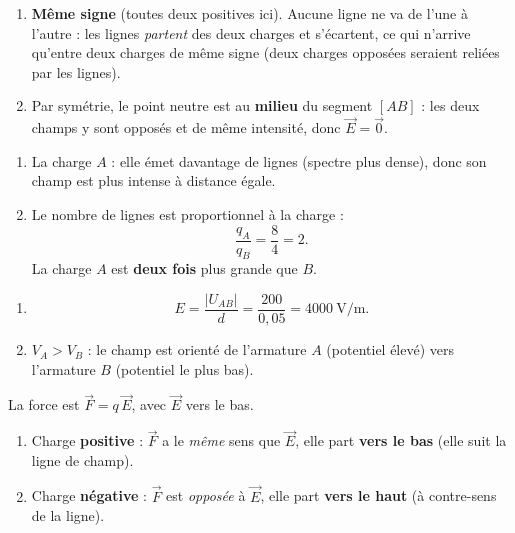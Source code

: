 \documentclass[11pt,a4paper]{article}
\newcommand{\vv}[1]{\vec{#1}}\newcommand{\ds}{\displaystyle}
\begin{document}

\begin{corrige}
\begin{enumerate}[label=\alph*)]
  \item \textbf{Même signe} (toutes deux positives ici). Aucune ligne ne va de l'une à l'autre : les
        lignes \emph{partent} des deux charges et s'écartent, ce qui n'arrive qu'entre deux charges
        de même signe (deux charges opposées seraient reliées par les lignes).
  \item Par symétrie, le point neutre est au \textbf{milieu} du segment $[AB]$ : les deux champs y
        sont opposés et de même intensité, donc $\vv{E} = \vv{0}$.
\end{enumerate}
\end{corrige}

\begin{corrige}
\begin{enumerate}[label=\alph*)]
  \item La charge \textbf{$A$} : elle émet davantage de lignes (spectre plus dense), donc son champ
        est plus intense à distance égale.
  \item Le nombre de lignes est proportionnel à la charge :
        \[ \frac{q_A}{q_B} = \frac{8}{4} = 2. \]
        La charge $A$ est \textbf{deux fois} plus grande que $B$.
\end{enumerate}
\end{corrige}

\begin{corrige}
\begin{enumerate}[label=\alph*)]
  \item \[ E = \frac{|U_{AB}|}{d} = \frac{200}{0{,}05} = \SI{4000}{\volt\per\metre}. \]
  \item $V_A > V_B$ : le champ est orienté de l'armature $A$ (potentiel élevé) vers l'armature $B$
        (potentiel le plus bas).
\end{enumerate}
\end{corrige}

\begin{corrige}
La force est $\vv{F} = q\,\vv{E}$, avec $\vv{E}$ vers le bas.
\begin{enumerate}[label=\alph*)]
  \item Charge \textbf{positive} : $\vv{F}$ a le \emph{même} sens que $\vv{E}$, elle part
        \textbf{vers le bas} (elle suit la ligne de champ).
  \item Charge \textbf{négative} : $\vv{F}$ est \emph{opposée} à $\vv{E}$, elle part \textbf{vers le
        haut} (à contre-sens de la ligne).
\end{enumerate}
\end{corrige}
\end{document}
